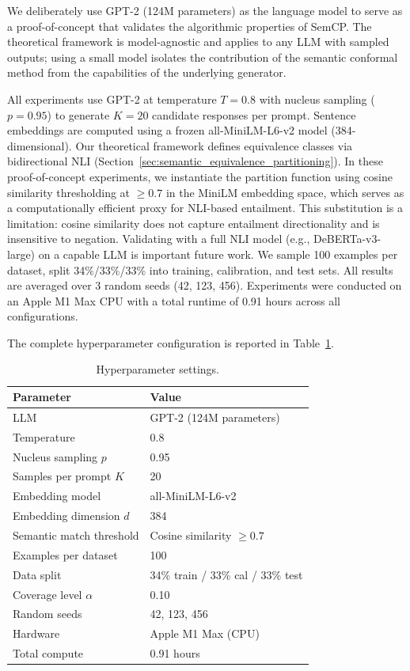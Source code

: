 \documentclass{article}
\begin{document}
We deliberately use GPT-2 (124M parameters) as the language model to serve as a proof-of-concept that validates the algorithmic properties of SemCP. The theoretical framework is model-agnostic and applies to any LLM with sampled outputs; using a small model isolates the contribution of the semantic conformal method from the capabilities of the underlying generator.

All experiments use GPT-2 at temperature $T = 0.8$ with nucleus sampling ($p = 0.95$) to generate $K = 20$ candidate responses per prompt. Sentence embeddings are computed using a frozen all-MiniLM-L6-v2 model (384-dimensional). Our theoretical framework defines equivalence classes via bidirectional NLI (Section~\ref{sec:semantic_equivalence_partitioning}). In these proof-of-concept experiments, we instantiate the partition function using cosine similarity thresholding at $\geq 0.7$ in the MiniLM embedding space, which serves as a computationally efficient proxy for NLI-based entailment. This substitution is a limitation: cosine similarity does not capture entailment directionality and is insensitive to negation. Validating with a full NLI model (e.g., DeBERTa-v3-large) on a capable LLM is important future work. We sample 100 examples per dataset, split 34\%/33\%/33\% into training, calibration, and test sets. All results are averaged over 3 random seeds (42, 123, 456). Experiments were conducted on an Apple M1 Max CPU with a total runtime of 0.91 hours across all configurations.

The complete hyperparameter configuration is reported in Table~\ref{tab:hyperparams}.

\begin{table}[ht]
\centering
\caption{Hyperparameter settings.}
\label{tab:hyperparams}
\begin{tabular}{ll}
\toprule
\textbf{Parameter} & \textbf{Value} \\
\midrule
LLM & GPT-2 (124M parameters) \\
Temperature & 0.8 \\
Nucleus sampling $p$ & 0.95 \\
Samples per prompt $K$ & 20 \\
Embedding model & all-MiniLM-L6-v2 \\
Embedding dimension $d$ & 384 \\
Semantic match threshold & Cosine similarity $\geq 0.7$ \\
Examples per dataset & 100 \\
Data split & 34\% train / 33\% cal / 33\% test \\
Coverage level $\alpha$ & 0.10 \\
Random seeds & 42, 123, 456 \\
Hardware & Apple M1 Max (CPU) \\
Total compute & 0.91 hours \\
\bottomrule
\end{tabular}
\end{table}
\end{document}
